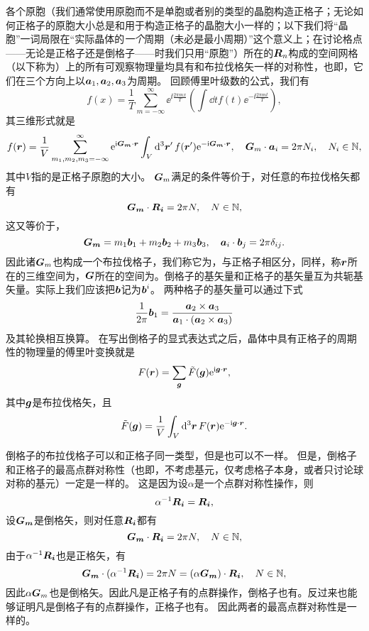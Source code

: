 各个原胞（我们通常使用原胞而不是单胞或者别的类型的晶胞构造正格子；无论如何正格子的原胞大小总是和用于构造正格子的晶胞大小一样的；以下我们将“晶胞”一词局限在“实际晶体的\emph{一个}周期（未必是最小周期）”这个意义上；在讨论格点——无论是正格子还是倒格子——时我们只用“原胞”）所在的$\vb*{R}_n$构成的空间网格（以下称为）上的所有可观察物理量均具有和布拉伐格矢一样的对称性，也即，它们在三个方向上以$\vb*{a}_1,\vb*{a}_2,\vb*{a}_3$为周期。
回顾傅里叶级数的公式，我们有
\[
    f(x) = \frac{1}{T} \sum_{m=-\infty}^\infty \ee^{\ii \frac{2\pi m x}{T}} \left(\int \dd{t} f(t) \ee^{-\ii \frac{2\pi m t}{T}}\right) ,
\]
其三维形式就是
\[
    f(\vb*{r}) = \frac{1}{V} \sum_{m_1, m_2, m_3=-\infty}^\infty \mathrm{e}^{\mathrm{i} \vb*{G}_{\vb*{m}} \cdot \vb*{r}} \int_V \dd[3]{\vb*{r}'} f(\vb*{r}') \mathrm{e}^{- \mathrm{i} \vb*{G}_{\vb*{m}} \cdot \vb*{r}}, \quad \vb*{G}_m \cdot \vb*{a}_i = 2\pi N_i, \quad N_i \in \mathbb{N},
\]
其中$V$指的是正格子原胞的大小。
$\vb*{G}_m$满足的条件等价于，对任意的布拉伐格矢都有
\begin{equation}
    \vb*{G}_{\vb*{m}} \cdot \vb*{R}_{\vb*{i}} = 2\pi N, \quad N \in \mathbb{N},
\end{equation}
这又等价于，
\begin{equation}
    \vb*{G}_{\vb*{m}} = m_1 \vb*{b}_1 + m_2 \vb*{b}_2 + m_3 \vb*{b}_3, \quad \vb*{a}_i \cdot \vb*{b}_j = 2 \pi \delta_{ij}.
\end{equation}
因此诸$\vb*{G}_m$也构成一个布拉伐格子，我们称它为，与正格子相区分，同样，称$\vb*{r}$所在的三维空间为，$\vb*{G}$所在的空间为。倒格子的基矢量和正格子的基矢量互为共轭基矢量。实际上我们应该把$\vb*{b}$记为$\vb*{b}^{i}$。
两种格子的基矢量可以通过下式
\begin{equation}
    \frac{1}{2\pi} \vb*{b}_1 = \frac{\vb*{a}_2 \times \vb*{a}_3}{\vb*{a}_1 \cdot (\vb*{a}_2 \times \vb*{a}_3)}
\end{equation}
及其轮换相互换算。
在写出倒格子的显式表达式之后，晶体中具有正格子的周期性的物理量的傅里叶变换就是
\begin{equation}
    F(\vb*{r}) = \sum_{\vb*{g}} \tilde{F}(\vb*{g}) \mathrm{e}^{\mathrm{i} \vb*{g} \cdot \vb*{r}},
\end{equation}
其中$\vb*{g}$是布拉伐格矢，且
\begin{equation}
    \tilde{F}(\vb*{g}) = \frac{1}{V} \int_V \dd[3]{\vb*{r}} F(\vb*{r}) \mathrm{e}^{-\mathrm{i} \vb*{g} \cdot \vb*{r}}.
\end{equation}

倒格子的布拉伐格子可以和正格子同一类型，但是也可以不一样。
但是，倒格子和正格子的最高点群对称性（也即，不考虑基元，仅考虑格子本身，或者只讨论球对称的基元）一定是一样的。
这是因为设$\alpha$是一个点群对称性操作，则
\[
    \alpha^{-1} \vb*{R}_{\vb*{i}} = \vb*{R}_{\vb*{i}},
\]
设$\vb*{G}_{\vb*{m}}$是倒格矢，则对任意$\vb*{R}_{\vb*{i}}$都有
\[
    \vb*{G}_{\vb*{m}} \cdot \vb*{R}_{\vb*{i}} = 2 \pi N, \quad N \in \mathbb{N},
\]
由于$\alpha^{-1} \vb*{R}_{\vb*{i}}$也是正格矢，有
\[
    \vb*{G}_{\vb*{m}} \cdot (\alpha^{-1} \vb*{R}_{\vb*{i}}) = 2 \pi N = (\alpha \vb*{G}_{\vb*{m}}) \cdot \vb*{R}_{\vb*{i}}, \quad N \in \mathbb{N},
\]
因此$\alpha \vb*{G}_m$也是倒格矢。因此凡是正格子有的点群操作，倒格子也有。反过来也能够证明凡是倒格子有的点群操作，正格子也有。
因此两者的最高点群对称性是一样的。

